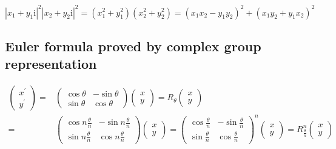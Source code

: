 \documentclass[
]{book}
\theoremstyle{definition}
\theoremstyle{definition}
\theoremstyle{definition}
\theoremstyle{definition}
\theoremstyle{remark}
\begin{document}
\[
\left|x_{{\scriptscriptstyle 1}}+y_{{\scriptscriptstyle 1}}\mathrm{i}\right|^{2}\left|x_{{\scriptscriptstyle 2}}+y_{{\scriptscriptstyle 2}}\mathrm{i}\right|^{2}=\left(x_{{\scriptscriptstyle 1}}^{2}+y_{{\scriptscriptstyle 1}}^{2}\right)\left(x_{{\scriptscriptstyle 2}}^{2}+y_{{\scriptscriptstyle 2}}^{2}\right)=\left(x_{{\scriptscriptstyle 1}}x_{{\scriptscriptstyle 2}}-y_{{\scriptscriptstyle 1}}y_{{\scriptscriptstyle 2}}\right)^{2}+\left(x_{{\scriptscriptstyle 1}}y_{{\scriptscriptstyle 2}}+y_{{\scriptscriptstyle 1}}x_{{\scriptscriptstyle 2}}\right)^{2}
\]

\subsection{Euler formula proved by complex group representation}\label{euler-formula-proved-by-complex-group-representation}

\[
\begin{aligned}
\begin{pmatrix}x^{\prime}\\
y^{\prime}
\end{pmatrix}= & \begin{pmatrix}\cos\theta & -\sin\theta\\
\sin\theta & \cos\theta
\end{pmatrix}\begin{pmatrix}x\\
y
\end{pmatrix}=R_{{\scriptscriptstyle \theta}}\begin{pmatrix}x\\
y
\end{pmatrix}\\
= & \begin{pmatrix}\cos n\frac{\theta}{n} & -\sin n\frac{\theta}{n}\\
\sin n\frac{\theta}{n} & \cos n\frac{\theta}{n}
\end{pmatrix}\begin{pmatrix}x\\
y
\end{pmatrix}=\begin{pmatrix}\cos\frac{\theta}{n} & -\sin\frac{\theta}{n}\\
\sin\frac{\theta}{n} & \cos\frac{\theta}{n}
\end{pmatrix}^{n}\begin{pmatrix}x\\
y
\end{pmatrix}=R_{{\scriptscriptstyle \frac{\theta}{n}}}^{n}\begin{pmatrix}x\\
y
\end{pmatrix}
\end{aligned}
\]
\end{document}
